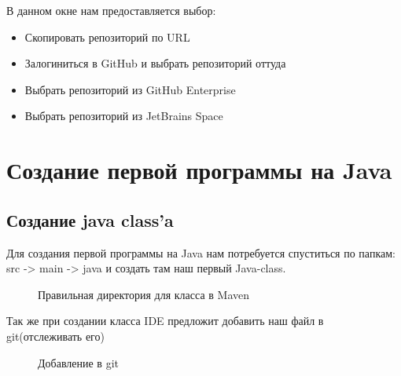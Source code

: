 \documentclass[12pt, a4paper]{article}
\begin{document}
    В данном окне нам предоставляется выбор:

    \begin{itemize}
        \item Скопировать репозиторий по URL
        \item Залогиниться в GitHub и выбрать репозиторий оттуда
        \item Выбрать репозиторий из GitHub Enterprise
        \item Выбрать репозиторий из JetBrains Space
    \end{itemize}

    \newpage
    \section{Создание первой программы на Java}

    \subsection{Создание java class'a}

    Для создания первой программы на Java нам потребуется спуститься по папкам: src -> main -> java 
    и создать там наш первый Java-class.

    \begin{figure}[H]
        \caption{Правильная директория для класса в Maven}
    \end{figure}

    Так же при создании класса IDE предложит добавить наш файл в git(отслеживать его)

    \begin{figure}[H]
        \caption{Добавление в git}
    \end{figure}
\end{document}
